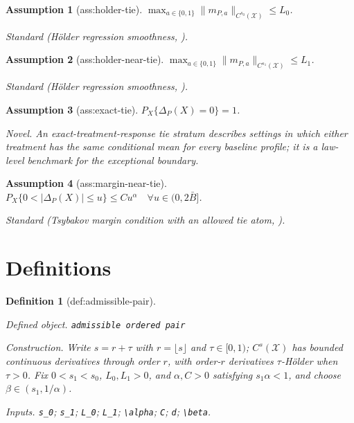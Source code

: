 \documentclass{article}
\newtheorem{assumption}{Assumption}
\newtheorem{definition}{Definition}
\begin{document}
\begin{assumption}[ass:holder-tie]\label{ass:holder-tie}
\(\max_{a\in\{0,1\}}\lVert m_{P,a}\rVert_{C^{s_0}(\mathcal X)}\le L_0\).
\par\smallskip\noindent\emph{Standard} (Hölder regression smoothness, \cite{AudibertTsybakov2007}).
\end{assumption}

\begin{assumption}[ass:holder-near-tie]\label{ass:holder-near-tie}
\(\max_{a\in\{0,1\}}\lVert m_{P,a}\rVert_{C^{s_1}(\mathcal X)}\le L_1\).
\par\smallskip\noindent\emph{Standard} (Hölder regression smoothness, \cite{AudibertTsybakov2007}).
\end{assumption}

\begin{assumption}[ass:exact-tie]\label{ass:exact-tie}
\(P_X\{\Delta_P(X)=0\}=1\).
\par\smallskip\noindent\emph{Novel.} An exact-treatment-response tie stratum describes settings in which either treatment has the same conditional mean for every baseline profile; it is a law-level benchmark for the exceptional boundary.
\end{assumption}

\begin{assumption}[ass:margin-near-tie]\label{ass:margin-near-tie}
\(P_X\{0<|\Delta_P(X)|\le u\}\le Cu^{\alpha}\quad\forall u\in(0,2\bar B]\).
\par\smallskip\noindent\emph{Standard} (Tsybakov margin condition with an allowed tie atom, \cite{AudibertTsybakov2007}).
\end{assumption}

\section{Definitions}

\begin{definition}[def:admissible-pair]\label{def:admissible-pair}
\par\smallskip\noindent\emph{Defined object.} \texttt{admissible ordered pair}
\par\smallskip\noindent\emph{Construction.} Write \(s=r+\tau\) with \(r=\lfloor s\rfloor\) and \(\tau\in[0,1)\); \(C^s(\mathcal X)\) has bounded continuous derivatives through order \(r\), with order-\(r\) derivatives \(\tau\)-Hölder when \(\tau>0\). Fix \(0<s_1<s_0\), \(L_0,L_1>0\), and \(\alpha,C>0\) satisfying \(s_1\alpha<1\), and choose \(\beta\in(s_1,1/\alpha)\).
\par\smallskip\noindent\emph{Inputs.} \texttt{s\_\allowbreak{}0}; \texttt{s\_\allowbreak{}1}; \texttt{L\_\allowbreak{}0}; \texttt{L\_\allowbreak{}1}; \texttt{\textbackslash{}\allowbreak{}alpha}; \texttt{C}; \texttt{d}; \texttt{\textbackslash{}\allowbreak{}beta}.
\end{definition}
\end{document}
